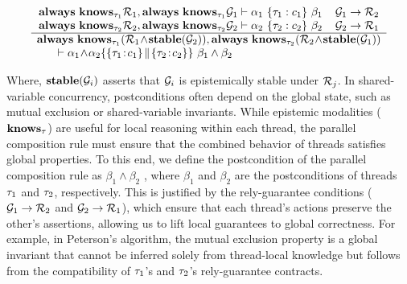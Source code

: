 


\[
\begin{array}{c}
\Always\ \Knows_{\tid_1}\rely_1, \Always\ \Knows_{\tid_1}\guarantee_1 \vdash \alpha_1\ \{\tid_1:c_1\}\  \beta_1 \hspace{0.4cm} \guarantee_1 \rightarrow \rely_2\\
\Always\ \Knows_{\tid_2}\rely_2, \Always\ \Knows_{\tid_2} \guarantee_2 \vdash \alpha_2\ \{\tid_2: c_2\}\  \beta_2 \hspace{0.4cm} \guarantee_2 \rightarrow \rely_1\\ \hline
\Always\ \Knows_{\tid_1}(\rely_1\! \wedge\! \stable(\guarantee_2)), \Always\ \Knows_{\tid_2}(\rely_2\! \wedge\! \stable(\guarantee_1)) \\ \hspace{-4cm}\vdash\alpha_1\! \wedge\! \alpha_2 \{\{\tid_1\!:\!c_1\}\! \parallel\! \{\tid_2\!:\!c_2\}\}\ \beta_1 \wedge \beta_2
\end{array}
\]

Where, $\mathbf{stable}(\mathcal{G}_i)$ asserts that $\mathcal{G}_i$ is epistemically stable under $\mathcal{R}_j$.
In shared-variable concurrency, postconditions often depend on the global state, such as mutual exclusion or shared-variable invariants. While epistemic modalities ($\mathbf{knows}_{\tau}$) are useful for local reasoning within each thread, the parallel composition rule must ensure that the combined behavior of threads satisfies global properties. To this end, we define the postcondition of the parallel composition rule as $\beta_1 \wedge \beta_2$ 
, where $\beta_1$ and $\beta_2$ are the postconditions of threads $\tau_1$
and $\tau_2$, respectively. This is justified by the rely-guarantee conditions ($\mathcal{G}_1 \rightarrow \mathcal{R}_2$ and $\mathcal{G}_2 \rightarrow \mathcal{R}_1$), which ensure that each thread's actions preserve the other's assertions, allowing us to lift local guarantees to global correctness. For example, in Peterson's algorithm, the mutual exclusion property is a global invariant that cannot be inferred solely from thread-local knowledge but follows from the compatibility of $\tau_1$'s and $\tau_2$'s rely-guarantee contracts.
